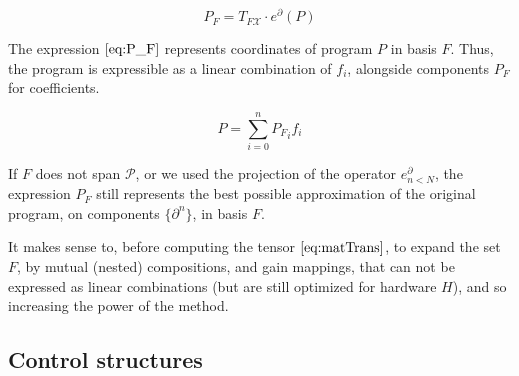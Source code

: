 \documentclass{article}
\newcommand{\X}{\mathcal{X}}
\newcommand{\dP}{\mathcal{P}}
\newcommand{\D}{\partial}
\begin{document}
  \begin{equation}\label{eq:P_F}
  	P_F=T_{F\X}\cdot e^\D(P)
  \end{equation}
  
  The expression $\eqref{eq:P_F}$ represents coordinates of program $P$ in basis $F$. Thus, the program is expressible as a linear combination of $f_i$, alongside components $P_F$ for coefficients.
  
  \begin{equation}
  P=\sum\limits_{i=0}^{n}{P_F}_if_i
  \end{equation}
  
  If $F$ does not span $\dP$, or we used the projection of the operator $e^\D_{n<N}$, the expression $P_F$ still represents the best possible approximation of the original program, on components $\{\D^n\}$, in basis $F$.
  
  It makes sense to, before computing the tensor $\eqref{eq:matTrans}$, to expand the set $F$, by mutual (nested) compositions, and gain mappings, that can not be expressed as linear combinations (but are still optimized for hardware $H$), and so increasing the power of the method.
  
 \subsection{Control structures}
 
\end{document}
